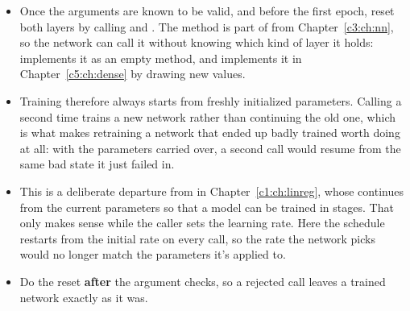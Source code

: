 \begin{itemize}
  \item Once the arguments are known to be valid, and before the first epoch, reset both layers by
    calling  and . The method is
    part of  from Chapter~\ref{c3:ch:nn}, so the network can call
    it without knowing which kind of layer it holds:  implements it as an empty method,
    and  implements it in Chapter~\ref{c5:ch:dense} by drawing new values.
  \item Training therefore always starts from freshly initialized parameters. Calling
     a second time trains a new network rather than continuing the old one, which is
    what makes retraining a network that ended up badly trained worth doing at all: with the
    parameters carried over, a second call would resume from the same bad state it just failed in.
  \item This is a deliberate departure from  in Chapter~\ref{c1:ch:linreg},
    whose  continues from the current parameters so that a model can be trained in
    stages. That only makes sense while the caller sets the learning rate. Here the schedule
    restarts from the initial rate on every call, so the rate the network picks would no longer
    match the parameters it's applied to.
  \item Do the reset \textbf{after} the argument checks, so a rejected call leaves a trained network
    exactly as it was.
\end{itemize}

